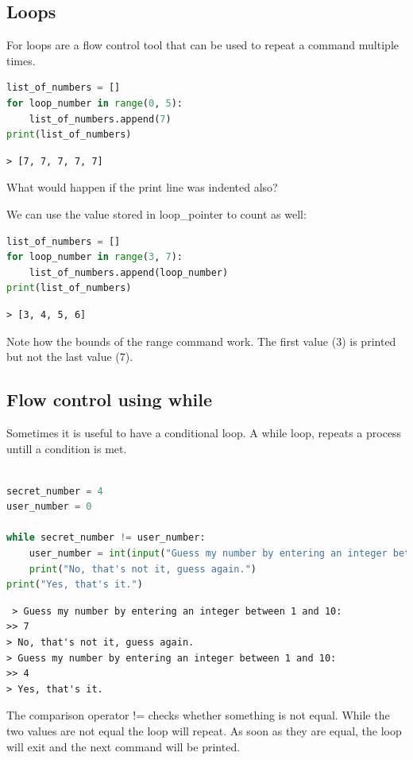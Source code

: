 	\subsection{Loops}
		For loops are a flow control tool that can be used to repeat a command multiple times.
		\begin{lstlisting}[language=Python]
list_of_numbers = []
for loop_number in range(0, 5):
	list_of_numbers.append(7)
print(list_of_numbers)\end{lstlisting}
		\begin{verbatim}> [7, 7, 7, 7, 7]\end{verbatim}

		\begin{task}What would happen if the print line was indented also?\end{task}
		We can use the value stored in loop\_pointer to count as well:
		\begin{lstlisting}[language=Python]
list_of_numbers = []
for loop_number in range(3, 7):
	list_of_numbers.append(loop_number)
print(list_of_numbers)\end{lstlisting}
\begin{verbatim}> [3, 4, 5, 6]\end{verbatim}

Note how the bounds of the range command work. The first value (3) is printed but not the last value (7).



	\subsection{Flow control using while}
		Sometimes it is useful to have a conditional loop. A while loop, repeats a process untill a condition is met.
\begin{lstlisting}[language=Python]

secret_number = 4
user_number = 0

while secret_number != user_number:
	user_number = int(input("Guess my number by entering an integer between 1 and 10: "
	print("No, that's not it, guess again.")
print("Yes, that's it.")\end{lstlisting}
		\begin{verbatim} > Guess my number by entering an integer between 1 and 10: 
>> 7
> No, that's not it, guess again.
> Guess my number by entering an integer between 1 and 10:
>> 4
> Yes, that's it.\end{verbatim}
		The comparison operator != checks whether something is not equal. While the two values are not equal the loop will repeat. As soon as they are equal, the loop will exit and the next command will be printed.




